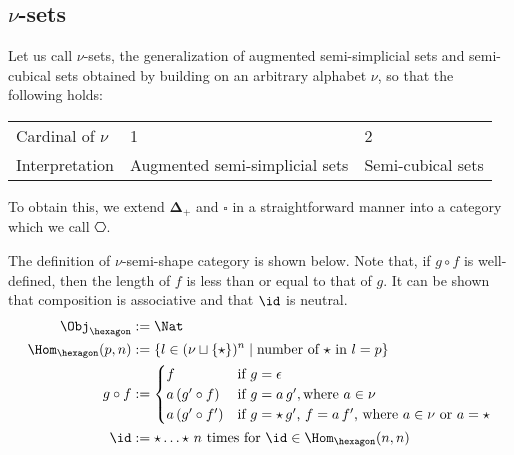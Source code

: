 \documentclass{art.cls/art}
\newcommand{\DeltaPlus}{\ensuremath{\boldsymbol{\Delta}_+}}
\newcommand{\Cube}{\ensuremath{\boldsymbol{{\square}}}}
\newcommand{\kstar}{{\star}}
\def\graymidrule{\arrayrulecolor{gray30}\midrule\arrayrulecolor{gray65}}
\begin{document}
\subsection*{\texorpdfstring{$\nu$}{ν}-sets}
Let us call $\nu$-sets, the generalization of augmented semi-simplicial sets and semi-cubical sets obtained by building on an arbitrary alphabet $\nu$, so that the following holds:

\begin{center}
  \begin{tabularx}{\linewidth}{X|X|X}
    \toprule
    Cardinal of $\nu$ & 1                              & 2                 \\
    \graymidrule
    Interpretation    & Augmented semi-simplicial sets & Semi-cubical sets \\
    \bottomrule
  \end{tabularx}
\end{center}

To obtain this, we extend $\DeltaPlus$ and $\Cube$ in a straightforward manner into a category which we call $\hexagon$.

\begin{definition}[$\hexagon$]
  The definition of $\nu$-semi-shape category is shown below. Note that, if $g \circ f$ is well-defined, then the length of $f$ is less than or equal to that of $g$. It can be shown that composition is associative and that $\id$ is neutral.
  \begin{align*}
    \Obj_{\hexagon}       & := \Nat                                                                          \\
    \Hom_{\hexagon}(p, n) & := \{l \in (\nu \sqcup \{\kstar\})^n \mid \text{number of $\kstar$ in $l = p$}\} \\
    g \circ f             & :=
    \begin{cases}
      f                & \text{if $g = \epsilon$}                                                   \\
      a\,(g' \circ f)  & \text{if $g = a\,g'$}, \text{where $a \in \nu$}                            \\
      a\,(g' \circ f') & \text{if $g = \kstar\,g'$, $f = a\,f'$, where $a \in \nu$ or $a = \kstar$} \\
    \end{cases}            \\
    \id                   & := \kstar \ldots \kstar \text{ $n$ times for $\id \in \Hom_{\hexagon}(n, n)$}
  \end{align*}
\end{definition}
\end{document}
